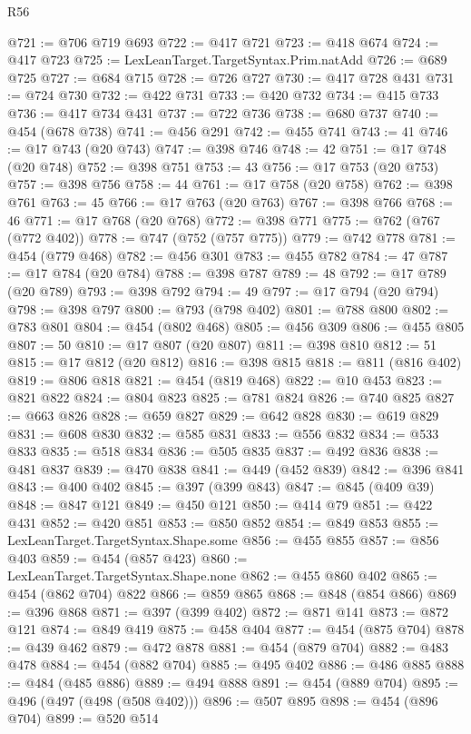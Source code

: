 \begin{lexlean}{R56}
\begin{coremodule}
@721 := @706 @719 @693
@722 := @417 @721
@723 := @418 @674
@724 := @417 @723
@725 := LexLeanTarget.TargetSyntax.Prim.natAdd
@726 := @689 @725
@727 := @684 @715
@728 := @726 @727
@730 := @417 @728 @431
@731 := @724 @730
@732 := @422 @731
@733 := @420 @732
@734 := @415 @733
@736 := @417 @734 @431
@737 := @722 @736
@738 := @680 @737
@740 := @454 (@678 @738)
@741 := @456 @291
@742 := @455 @741
@743 := 41
@746 := @17 @743 (@20 @743)
@747 := @398 @746
@748 := 42
@751 := @17 @748 (@20 @748)
@752 := @398 @751
@753 := 43
@756 := @17 @753 (@20 @753)
@757 := @398 @756
@758 := 44
@761 := @17 @758 (@20 @758)
@762 := @398 @761
@763 := 45
@766 := @17 @763 (@20 @763)
@767 := @398 @766
@768 := 46
@771 := @17 @768 (@20 @768)
@772 := @398 @771
@775 := @762 (@767 (@772 @402))
@778 := @747 (@752 (@757 @775))
@779 := @742 @778
@781 := @454 (@779 @468)
@782 := @456 @301
@783 := @455 @782
@784 := 47
@787 := @17 @784 (@20 @784)
@788 := @398 @787
@789 := 48
@792 := @17 @789 (@20 @789)
@793 := @398 @792
@794 := 49
@797 := @17 @794 (@20 @794)
@798 := @398 @797
@800 := @793 (@798 @402)
@801 := @788 @800
@802 := @783 @801
@804 := @454 (@802 @468)
@805 := @456 @309
@806 := @455 @805
@807 := 50
@810 := @17 @807 (@20 @807)
@811 := @398 @810
@812 := 51
@815 := @17 @812 (@20 @812)
@816 := @398 @815
@818 := @811 (@816 @402)
@819 := @806 @818
@821 := @454 (@819 @468)
@822 := @10 @453
@823 := @821 @822
@824 := @804 @823
@825 := @781 @824
@826 := @740 @825
@827 := @663 @826
@828 := @659 @827
@829 := @642 @828
@830 := @619 @829
@831 := @608 @830
@832 := @585 @831
@833 := @556 @832
@834 := @533 @833
@835 := @518 @834
@836 := @505 @835
@837 := @492 @836
@838 := @481 @837
@839 := @470 @838
@841 := @449 (@452 @839)
@842 := @396 @841
@843 := @400 @402
@845 := @397 (@399 @843)
@847 := @845 (@409 @39)
@848 := @847 @121
@849 := @450 @121
@850 := @414 @79
@851 := @422 @431
@852 := @420 @851
@853 := @850 @852
@854 := @849 @853
@855 := LexLeanTarget.TargetSyntax.Shape.some
@856 := @455 @855
@857 := @856 @403
@859 := @454 (@857 @423)
@860 := LexLeanTarget.TargetSyntax.Shape.none
@862 := @455 @860 @402
@865 := @454 (@862 @704) @822
@866 := @859 @865
@868 := @848 (@854 @866)
@869 := @396 @868
@871 := @397 (@399 @402)
@872 := @871 @141
@873 := @872 @121
@874 := @849 @419
@875 := @458 @404
@877 := @454 (@875 @704)
@878 := @439 @462
@879 := @472 @878
@881 := @454 (@879 @704)
@882 := @483 @478
@884 := @454 (@882 @704)
@885 := @495 @402
@886 := @486 @885
@888 := @484 (@485 @886)
@889 := @494 @888
@891 := @454 (@889 @704)
@895 := @496 (@497 (@498 (@508 @402)))
@896 := @507 @895
@898 := @454 (@896 @704)
@899 := @520 @514

\end{coremodule}
\end{lexlean}
